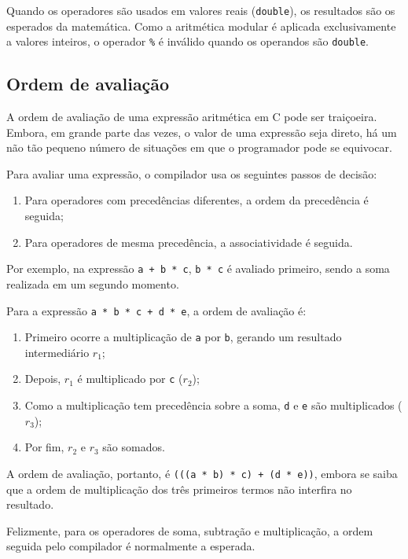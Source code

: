 \documentclass[
  11pt,
  a4paper,
]{scrbook}
\providecommand{\tightlist}{%
  \setlength{\itemsep}{0pt}\setlength{\parskip}{0pt}}\usepackage{longtable,booktabs,array}
\begin{document}
Quando os operadores são usados em valores reais (\texttt{double}), os
resultados são os esperados da matemática. Como a aritmética modular é
aplicada exclusivamente a valores inteiros, o operador \texttt{\%} é
inválido quando os operandos são \texttt{double}.

\subsection{Ordem de avaliação}\label{ordem-de-avaliauxe7uxe3o}

A ordem de avaliação de uma expressão aritmética em C pode ser
traiçoeira. Embora, em grande parte das vezes, o valor de uma expressão
seja direto, há um não tão pequeno número de situações em que o
programador pode se equivocar.

Para avaliar uma expressão, o compilador usa os seguintes passos de
decisão:

\begin{enumerate}
\tightlist
\item
  Para operadores com precedências diferentes, a ordem da precedência é
  seguida;
\item
  Para operadores de mesma precedência, a associatividade é seguida.
\end{enumerate}

Por exemplo, na expressão \texttt{a\ +\ b\ *\ c}, \texttt{b\ *\ c} é
avaliado primeiro, sendo a soma realizada em um segundo momento.

Para a expressão \texttt{a\ *\ b\ *\ c\ +\ d\ *\ e}, a ordem de
avaliação é:

\begin{enumerate}
\tightlist
\item
  Primeiro ocorre a multiplicação de \texttt{a} por \texttt{b}, gerando
  um resultado intermediário \(r_1\);
\item
  Depois, \(r_1\) é multiplicado por \texttt{c} (\(r_2\));
\item
  Como a multiplicação tem precedência sobre a soma, \texttt{d} e
  \texttt{e} são multiplicados (\(r_3\));
\item
  Por fim, \(r_2\) e \(r_3\) são somados.
\end{enumerate}

A ordem de avaliação, portanto, é
\texttt{(((a\ *\ b)\ *\ c)\ +\ (d\ *\ e))}, embora se saiba que a ordem
de multiplicação dos três primeiros termos não interfira no resultado.

Felizmente, para os operadores de soma, subtração e multiplicação, a
ordem seguida pelo compilador é normalmente a esperada.
\end{document}
